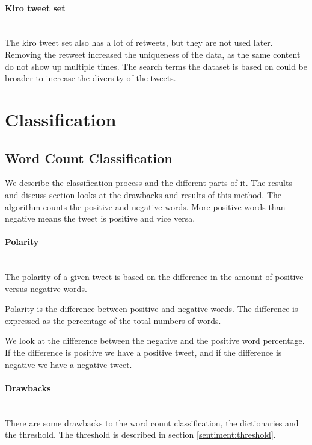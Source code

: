 \paragraph{Kiro tweet set}
\hspace{0pt}\\
The kiro tweet set also has a lot of retweets, but they are not used later.
Removing the retweet increased the uniqueness of the data, as the same content
do not show up multiple times. The search terms the dataset is based on
could be broader to increase the diversity of the tweets.
%

\section{Classification}\label{sentiment:classification}
\subsection{Word Count Classification}\label{sentiment:word_count_classification}
We describe the classification process and the different parts of it. The
results and discuss section looks at the drawbacks and results of this method.
The algorithm counts the positive and negative words. More positive words than
negative means the tweet is positive and vice versa. 

\paragraph{Polarity} 
\hspace{0pt}\\ 
The polarity of a given tweet is based on the difference in the amount of
positive versus negative words. 

Polarity is the difference between positive and negative words. The difference is
expressed as the percentage of the total numbers of words.  

We look at the difference between the negative and the positive word
percentage. If the difference is positive we have a positive tweet, and if the
difference is negative we have a negative tweet.

\paragraph{Drawbacks}
\hspace{0pt}\\
There are some drawbacks to the word count classification, the dictionaries
and the threshold. The threshold is described in section
\ref{sentiment:threshold}. 

